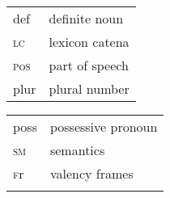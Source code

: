 \documentclass[output=paper]{langsci/langscibook}
\begin{document}
\begin{tabularx}{.45\textwidth}{lQ}
 def & definite noun  \\
\textsc{lc} & lexicon catena  \\
\textsc{p}o\textsc{s} & part of speech \\
plur & plural number  \\
\end{tabularx}
\begin{tabularx}{.45\textwidth}{lQ}
poss & possessive pronoun  \\
\textsc{sm} & semantics\\
\textsc{f}r & valency frames  \\
\\
\end{tabularx} 

{\sloppy
\printbibliography[heading=subbibliography,notkeyword=this]
}
\end{document}
